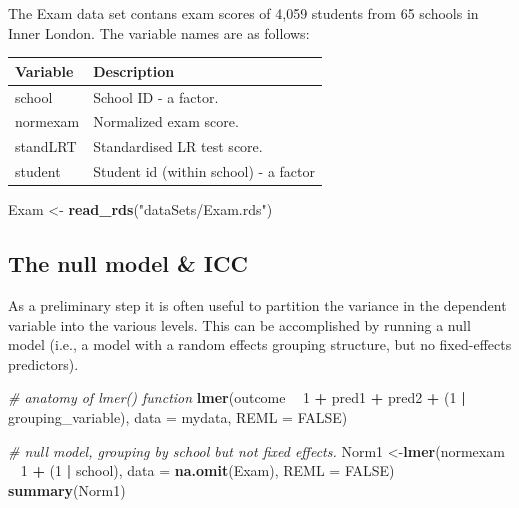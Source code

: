 \documentclass[
]{book}
\newenvironment{Shaded}{\begin{snugshade}}{\end{snugshade}}
\newcommand{\CommentTok}[1]{\textcolor[rgb]{0.56,0.35,0.01}{\textit{#1}}}
\newcommand{\DataTypeTok}[1]{\textcolor[rgb]{0.13,0.29,0.53}{#1}}
\newcommand{\DecValTok}[1]{\textcolor[rgb]{0.00,0.00,0.81}{#1}}
\newcommand{\KeywordTok}[1]{\textcolor[rgb]{0.13,0.29,0.53}{\textbf{#1}}}
\newcommand{\NormalTok}[1]{#1}
\newcommand{\OperatorTok}[1]{\textcolor[rgb]{0.81,0.36,0.00}{\textbf{#1}}}
\newcommand{\OtherTok}[1]{\textcolor[rgb]{0.56,0.35,0.01}{#1}}
\newcommand{\StringTok}[1]{\textcolor[rgb]{0.31,0.60,0.02}{#1}}
\begin{document}
The Exam data set contans exam scores of 4,059 students from 65 schools in Inner London. The variable names are as follows:

\begin{longtable}[]{@{}ll@{}}
\toprule
Variable & Description\tabularnewline
\midrule
\endhead
school & School ID - a factor.\tabularnewline
normexam & Normalized exam score.\tabularnewline
standLRT & Standardised LR test score.\tabularnewline
student & Student id (within school) - a factor\tabularnewline
\bottomrule
\end{longtable}

\begin{Shaded}
\begin{Highlighting}[]
\NormalTok{  Exam <-}\StringTok{ }\KeywordTok{read_rds}\NormalTok{(}\StringTok{"dataSets/Exam.rds"}\NormalTok{)}
\end{Highlighting}
\end{Shaded}

\hypertarget{the-null-model-icc}{%
\subsection{The null model \& ICC}\label{the-null-model-icc}}

As a preliminary step it is often useful to partition the variance in the dependent variable into the various levels. This can be accomplished by running a null model (i.e., a model with a random effects grouping structure, but no fixed-effects predictors).

\begin{Shaded}
\begin{Highlighting}[]
  \CommentTok{# anatomy of lmer() function}
  \KeywordTok{lmer}\NormalTok{(outcome }\OperatorTok{~}\StringTok{ }\DecValTok{1} \OperatorTok{+}\StringTok{ }\NormalTok{pred1 }\OperatorTok{+}\StringTok{ }\NormalTok{pred2 }\OperatorTok{+}\StringTok{ }\NormalTok{(}\DecValTok{1} \OperatorTok{|}\StringTok{ }\NormalTok{grouping_variable), }
       \DataTypeTok{data =}\NormalTok{ mydata, }
       \DataTypeTok{REML =} \OtherTok{FALSE}\NormalTok{)}
\end{Highlighting}
\end{Shaded}

\begin{Shaded}
\begin{Highlighting}[]
  \CommentTok{# null model, grouping by school but not fixed effects.}
\NormalTok{  Norm1 <-}\KeywordTok{lmer}\NormalTok{(normexam }\OperatorTok{~}\StringTok{ }\DecValTok{1} \OperatorTok{+}\StringTok{ }\NormalTok{(}\DecValTok{1} \OperatorTok{|}\StringTok{ }\NormalTok{school), }
              \DataTypeTok{data =} \KeywordTok{na.omit}\NormalTok{(Exam), }\DataTypeTok{REML =} \OtherTok{FALSE}\NormalTok{)}
  \KeywordTok{summary}\NormalTok{(Norm1)}
\end{Highlighting}
\end{Shaded}
\end{document}
